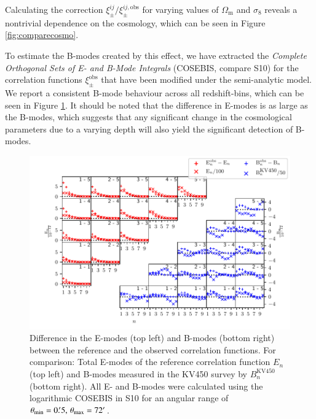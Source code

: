 \documentclass[referee]{aa} %
\renewcommand{\[}{\begin{equation}}
\renewcommand{\]}{\end{equation}}
\renewcommand{\rm}{\mathrm}
\begin{document}
Calculating the correction $\xi_\pm^{ij}/\xi_\pm^{ij,\rm{obs}}$ for varying values of $\Omega_{\rm{m}}$ and $\sigma_8$ reveals a nontrivial dependence on the cosmology, which can be seen in Figure \ref{fig:comparecosmo}.

To estimate the B-modes created by this effect, we have extracted the \emph{Complete Orthogonal Sets of E- and B-Mode Integrals} (COSEBIS, compare S10)
 for the correlation functions $\xi_\pm^{\rm{obs}}$ that have been modified under the semi-analytic model. We report a consistent B-mode behaviour across all redshift-bins, which can be seen in Figure \ref{fig:bmodes_cosebi}. It should be noted that the difference in E-modes is as large as the B-modes, which suggests that any significant change in the cosmological parameters due to a varying depth will also yield the significant detection of B-modes.


\begin{figure}
\centering
\includegraphics[width = \textwidth]{images/ebmodes0p5t72.pdf}
\caption{Difference in the E-modes (top left) and B-modes (bottom right) between the reference and the observed correlation functions. For comparison: Total E-modes of the reference correlation function $E_n$ (top left) and B-modes measured in the KV450 survey by \citet{2019A&A...624A.134A} $B_n^{\rm{KV450}}$ (bottom right). All E- and B-modes were calculated using the logarithmic COSEBIS in S10 for an angular range of $\theta_{\rm{min}}=0.\!^\prime 5,\,\theta_{\rm{max}}=72\arcmin$.}
\label{fig:bmodes_cosebi}
\end{figure}
\end{document}
